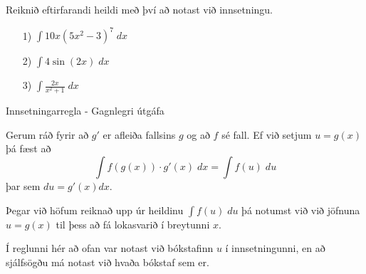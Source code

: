\begin{æd}
Reiknið eftirfarandi heildi með því að notast við innsetningu.

\begin{itemize}
\item[1)] $\displaystyle \int 10x\left(5x^{2}-3\right)^{7} \; dx$

\item[2)] $\displaystyle \int 4\sin\left(2x\right) \; dx$

\item[3)] $\displaystyle \int \frac{2x}{x^{2}+1} \; dx$
\end{itemize}
\end{æd}

\begin{regla}{Innsetningarregla - Gagnlegri útgáfa}

Gerum ráð fyrir að $g'$ er afleiða fallsins $g$ og að $f$ sé fall. Ef við setjum $u = g(x)$ þá fæst að
$$
\int f(g(x))\cdot g'(x) \;dx = \int f(u)\; du
$$
þar sem $du = g'(x)dx$.
\end{regla}

\begin{ath}
Þegar við höfum reiknað upp úr heildinu $\int f(u) \; du$ þá notumst við við jöfnuna $u = g(x)$ til þess að fá lokasvarið í breytunni $x$.
\end{ath}

\begin{ath}
Í reglunni hér að ofan var notast við bókstafinn $u$ í innsetningunni, en að sjálfsögðu má notast við hvaða bókstaf sem er.
\end{ath}

